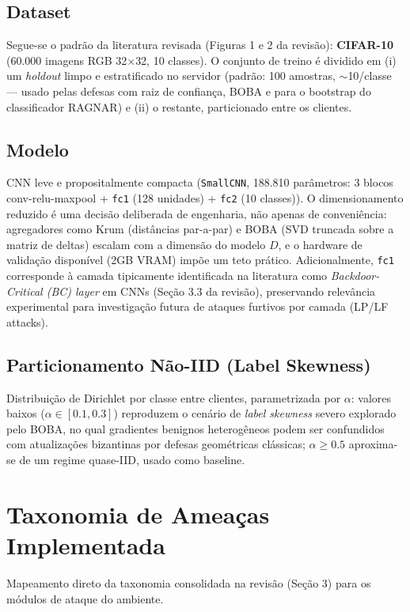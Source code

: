 \documentclass[11pt,a4paper]{article}
\begin{document}
\subsection{Dataset}
Segue-se o padrão da literatura revisada (Figuras 1 e 2 da revisão): \textbf{CIFAR-10} (60.000 imagens
RGB 32$\times$32, 10 classes). O conjunto de treino é dividido em (i) um \textit{holdout} limpo e
estratificado no servidor (padrão: 100 amostras, $\sim$10/classe — usado pelas defesas com raiz de
confiança, BOBA e para o bootstrap do classificador RAGNAR) e (ii) o restante, particionado entre os
clientes.

\subsection{Modelo}
CNN leve e propositalmente compacta (\texttt{SmallCNN}, 188.810 parâmetros: 3 blocos conv-relu-maxpool +
\texttt{fc1} (128 unidades) + \texttt{fc2} (10 classes)). O dimensionamento reduzido é uma decisão
deliberada de engenharia, não apenas de conveniência: agregadores como Krum (distâncias par-a-par) e BOBA
(SVD truncada sobre a matriz de deltas) escalam com a dimensão do modelo $D$, e o hardware de validação
disponível (2GB VRAM) impõe um teto prático. Adicionalmente, \texttt{fc1} corresponde à camada
tipicamente identificada na literatura como \textit{Backdoor-Critical (BC) layer} em CNNs (Seção 3.3 da
revisão), preservando relevância experimental para investigação futura de ataques furtivos por camada
(LP/LF attacks).

\subsection{Particionamento Não-IID (Label Skewness)}
Distribuição de Dirichlet por classe entre clientes, parametrizada por $\alpha$: valores baixos
($\alpha \in [0.1, 0.3]$) reproduzem o cenário de \textit{label skewness} severo explorado pelo BOBA, no
qual gradientes benignos heterogêneos podem ser confundidos com atualizações bizantinas por defesas
geométricas clássicas; $\alpha \geq 0.5$ aproxima-se de um regime quase-IID, usado como baseline.

\section{Taxonomia de Ameaças Implementada}
Mapeamento direto da taxonomia consolidada na revisão (Seção 3) para os módulos de ataque do ambiente.
\end{document}
